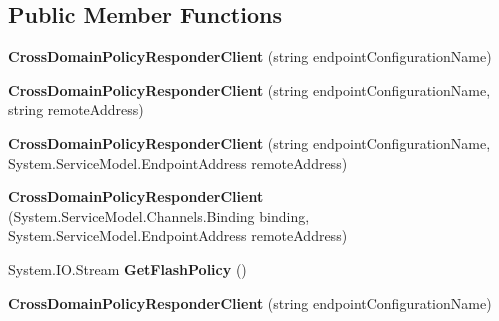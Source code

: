 \subsection*{Public Member Functions}
\begin{DoxyCompactItemize}
\item 
\hypertarget{class_tripi_w_c_f_1_1_client_mockup_1_1_proxy_1_1_cross_domain_policy_responder_client_a1c3e714c69ed57a59bdb3b75795580af}{
{\bfseries CrossDomainPolicyResponderClient} (string endpointConfigurationName)}
\label{class_tripi_w_c_f_1_1_client_mockup_1_1_proxy_1_1_cross_domain_policy_responder_client_a1c3e714c69ed57a59bdb3b75795580af}

\item 
\hypertarget{class_tripi_w_c_f_1_1_client_mockup_1_1_proxy_1_1_cross_domain_policy_responder_client_a2ff9ef3fbb572c6ed3b4f1fd0c9647f6}{
{\bfseries CrossDomainPolicyResponderClient} (string endpointConfigurationName, string remoteAddress)}
\label{class_tripi_w_c_f_1_1_client_mockup_1_1_proxy_1_1_cross_domain_policy_responder_client_a2ff9ef3fbb572c6ed3b4f1fd0c9647f6}

\item 
\hypertarget{class_tripi_w_c_f_1_1_client_mockup_1_1_proxy_1_1_cross_domain_policy_responder_client_a8c20d5420735a3405736fc8f579a6f59}{
{\bfseries CrossDomainPolicyResponderClient} (string endpointConfigurationName, System.ServiceModel.EndpointAddress remoteAddress)}
\label{class_tripi_w_c_f_1_1_client_mockup_1_1_proxy_1_1_cross_domain_policy_responder_client_a8c20d5420735a3405736fc8f579a6f59}

\item 
\hypertarget{class_tripi_w_c_f_1_1_client_mockup_1_1_proxy_1_1_cross_domain_policy_responder_client_a25830c515ea9a9a917bdbfb0f93fe948}{
{\bfseries CrossDomainPolicyResponderClient} (System.ServiceModel.Channels.Binding binding, System.ServiceModel.EndpointAddress remoteAddress)}
\label{class_tripi_w_c_f_1_1_client_mockup_1_1_proxy_1_1_cross_domain_policy_responder_client_a25830c515ea9a9a917bdbfb0f93fe948}

\item 
\hypertarget{class_tripi_w_c_f_1_1_client_mockup_1_1_proxy_1_1_cross_domain_policy_responder_client_a0246400572a505db33fd2489f6d879af}{
System.IO.Stream {\bfseries GetFlashPolicy} ()}
\label{class_tripi_w_c_f_1_1_client_mockup_1_1_proxy_1_1_cross_domain_policy_responder_client_a0246400572a505db33fd2489f6d879af}

\item 
\hypertarget{class_tripi_w_c_f_1_1_client_mockup_1_1_proxy_1_1_cross_domain_policy_responder_client_a1c3e714c69ed57a59bdb3b75795580af}{
{\bfseries CrossDomainPolicyResponderClient} (string endpointConfigurationName)}
\label{class_tripi_w_c_f_1_1_client_mockup_1_1_proxy_1_1_cross_domain_policy_responder_client_a1c3e714c69ed57a59bdb3b75795580af}


\end{DoxyCompactItemize}
